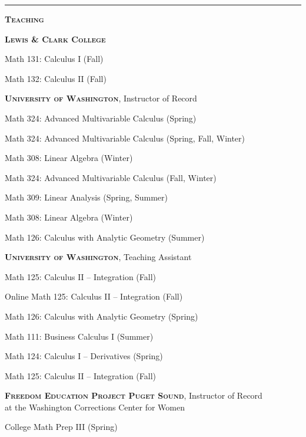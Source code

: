 \documentclass[12pt]{article}
\newcommand{\sectionheading}[1]
	{\bigskip %
	\noindent
	\hspace{-6.5mm}\textcolor{Gray}{\rule[.75mm]{21.5mm}{1mm}}
	\hspace{.2mm}	%
	{\large{\textbf{\textsc{#1}}}} %
}
\newenvironment{date_section}
	{
	\vspace{-1ex}
	\leftmargini = 15ex
	 \begin{itemize}[
		 labelsep = *,
		 labelwidth = 9ex,
		 labelindent = 0ex,
		 itemindent = !,
		 font=\normalfont, 
		 align=parleft
		 ]
		{}
		\itemsep=-1.5mm}
	{\end{itemize}\vspace{-2ex}}
\newcommand{\yearmo}[2]{
	\item[\hspace{-5.75ex} 
		{\makebox[.0005ex][r]{#1}}
		\hspace{1.15ex}
		{\makebox[.05ex][l]{#2} }
		] }
\newcommand{\yearsingle}[2]{
			\item[  
				{\makebox[.0005ex][r]{#1}}
				\hspace{2ex}
				{\makebox[.05ex][l]{#2} }
				] }
\begin{document}
	
		\sectionheading{Teaching}%
		
		    \begin{date_section}
				\yearmo{}{}\textbf{\textsc{Lewis \& Clark College}}
				\yearsingle{}{2019}
					Math 131: Calculus I (Fall)
				\yearsingle{}{}
					Math 132: Calculus II (Fall)
		
				\yearmo{}{}\textbf{\textsc{University of Washington}}, Instructor of Record
				\yearsingle{}{2019}
					Math 324: Advanced Multivariable Calculus (Spring)
				\yearsingle{}{2018}
					Math 324: Advanced Multivariable Calculus (Spring, Fall, Winter)
				\yearsingle{}{}
					Math 308: Linear Algebra (Winter) 
				\yearsingle{}{2017}
	                Math 324: Advanced Multivariable Calculus (Fall, Winter)
				\yearsingle{}{2016}
	                Math 309: Linear Analysis (Spring, Summer) 
	            \yearsingle{}{}
	                Math 308: Linear Algebra (Winter)
				\yearsingle{}{2015}
					Math 126: Calculus with Analytic Geometry (Summer)
				\vspace{.3cm}
	            \yearsingle{}{}\textbf{\textsc{University of Washington}}, Teaching Assistant
	            \yearsingle{}{2016}
	            	Math 125: Calculus II -- Integration (Fall)           
	            \yearsingle{}{2015}
	                Online Math 125: Calculus II -- Integration (Fall)
	            \yearsingle{}{}
	            	Math 126: Calculus with Analytic Geometry (Spring)	            
	            \yearsingle{}{2014}
	            	Math 111: Business Calculus I (Summer)
	            \yearsingle{}{}
	            	Math 124: Calculus I -- Derivatives (Spring)
	            \yearsingle{}{2013}
	                Math 125: Calculus II -- Integration (Fall)
	            \vspace{.3cm}    
	           \yearsingle{}{}\textbf{\textsc{Freedom Education Project Puget Sound}}, Instructor of Record\\
	            at the Washington Corrections Center for Women
	           	\yearsingle{}{2018}
	           	           		College Math Prep III (Spring)	 

\end{date_section}
\end{document}
